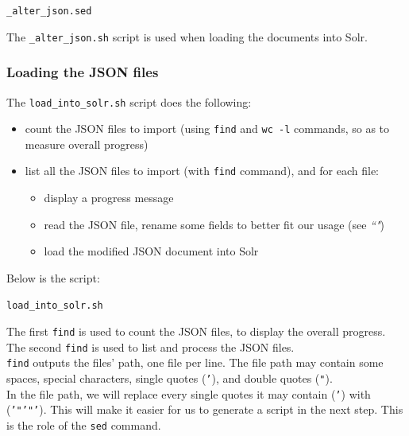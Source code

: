 \texttt{\_alter\_json.sed}

\bigskip

The \texttt{\_alter\_json.sh} script is used when loading the documents into Solr. \\




\subsubsection{Loading the JSON files} \label{loading-JSON-files}


The \texttt{load\_into\_solr.sh} script does the following:

\begin{itemize}
	\item count the JSON files to import (using \texttt{find} and \texttt{wc -l} commands, so as to measure overall progress)
	
	\item list all the JSON files to import (with \texttt{find} command), and for each file:
	
	\begin{itemize}
		\item display a progress message
		\item read the JSON file, rename some fields to better fit our usage (see \emph{``"})
		\item load the modified JSON document into Solr
	\end{itemize}
\end{itemize}

Below is the script: \\

\bigskip

\texttt{load\_into\_solr.sh}

\bigskip


The first \texttt{find} is used to count the JSON files, to display the overall progress. \\

The second \texttt{find} is used to list and process the JSON files. \\

\texttt{find} outputs the files' path, one file per line. The file path may contain some spaces, special characters, single quotes (\texttt{'}), and double quotes (\texttt{"}). \\

In the file path, we will replace every single quotes it may contain (\texttt{'}) with (\texttt{'"'"'}). This will make it easier for us to generate a script in the next step. This is the role of the \texttt{sed} command. \\

